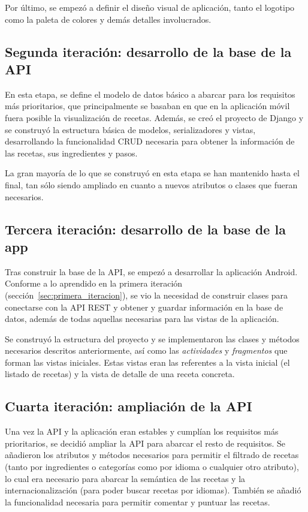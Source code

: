 Por último, se empezó a definir el diseño visual de aplicación, tanto el
logotipo como la paleta de colores y demás detalles involucrados.


\subsection{Segunda iteración: desarrollo de la base de la API}
\label{sec:segunda_iteracion}

En esta etapa, se define el modelo de datos básico a abarcar para los requisitos
más prioritarios, que principalmente se basaban en que en la aplicación móvil
fuera posible la visualización de recetas. Además, se creó el proyecto de Django
y se construyó la estructura básica de modelos, serializadores y vistas,
desarrollando la funcionalidad CRUD necesaria para obtener la información de las
recetas, sus ingredientes y pasos.

La gran mayoría de lo que se construyó en esta etapa se han mantenido hasta el
final, tan sólo siendo ampliado en cuanto a nuevos atributos o clases que fueran
necesarios.


\subsection{Tercera iteración: desarrollo de la base de la app}
\label{sec:tercera_iteracion}

Tras construir la base de la API, se empezó a desarrollar la aplicación Android.
Conforme a lo aprendido en la primera iteración
(sección~\ref{sec:primera_iteracion}), se vio la necesidad de construir clases
para conectarse con la API \ac{REST} y obtener y guardar información
en la base de datos, además de todas aquellas necesarias para las vistas de la
aplicación.

Se construyó la estructura del proyecto y se implementaron las clases y métodos
necesarios descritos anteriormente, así como las \textit{actividades} y
\textit{fragmentos} que forman las vistas iniciales. Estas vistas eran las
referentes a la vista inicial (el listado de recetas) y la vista de detalle de
una receta concreta.


\subsection{Cuarta iteración: ampliación de la API}
\label{sec:cuarta_iteracion}

Una vez la API y la aplicación eran estables y cumplían los requisitos más
prioritarios, se decidió ampliar la API para abarcar el resto de requisitos. Se
añadieron los atributos y métodos necesarios para permitir el filtrado de recetas
(tanto por ingredientes o categorías como por idioma o cualquier otro atributo),
lo cual era necesario para abarcar la semántica de las recetas y la
internacionalización (para poder buscar recetas por idiomas). También se añadió
la funcionalidad necesaria para permitir comentar y puntuar las recetas.


